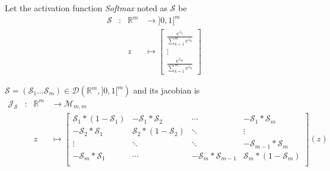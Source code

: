 \documentclass[11pt,en]{elegantpaper}
\newcommand{\Real}{\mathbb{R}}
\begin{document}
\begin{definition}
  Let the activation function \textit{Softmax} noted as $\mathcal{S}$ be
  \begin{equation*}
    \begin{array}{llll}
      \mathcal{S} & : & \Real^m & \longrightarrow ]0,1[^m \\
      &   & z & \longmapsto \begin{bmatrix}
        \frac{e^{z_1}}{\sum_{k=1}^m e^{z_k}} \\
        \vdots \\
        \frac{e^{z_m}}{\sum_{k=1}^m e^{z_k}}
      \end{bmatrix}
    \end{array}
  \end{equation*} \par
\end{definition}

\begin{proposition}
  {\normalfont
    $\mathcal{S} = (\mathcal{S}_1 \ldots \mathcal{S}_m) \in \mathcal{D}(\Real^m,]0,1[^m)$ and its jacobian is \begin{equation}\label{prop:softmax_differential}
      \begin{array}{llll}
        \mathcal{J}_{\mathcal{S}} & : & \Real^m  & \longrightarrow \mathcal{M}_{m,m} \\
        &   & z & \longmapsto \begin{bmatrix}
          \mathcal{S}_1 * (1 - \mathcal{S}_1) & - \mathcal{S}_1 * \mathcal{S}_2 & \cdots & - \mathcal{S}_1 * \mathcal{S}_m \\
          - \mathcal{S}_2 * \mathcal{S}_1 & \mathcal{S}_2 * (1 - \mathcal{S}_2) & \ddots & \vdots \\
          \vdots & \ddots & \ddots & - \mathcal{S}_{m-1} * \mathcal{S}_m \\
          - \mathcal{S}_m * \mathcal{S}_1 & \cdots & - \mathcal{S}_m * \mathcal{S}_{m-1} & \mathcal{S}_m * (1 - \mathcal{S}_m) \\
        \end{bmatrix} (z)
      \end{array}
    \end{equation}
  }
\end{proposition}
\end{document}
